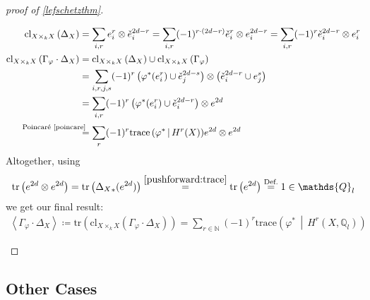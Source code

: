 \documentclass[english]{scrartcl}
\theoremstyle{definition}
\theoremstyle{remark}
\newcommand*{\N}{\mathds{N}}
\newcommand*{\Z}{\mathds{Z}}
\newcommand*{\Q}{\mathds{Q}}
\newcommand*{\Zl}{\Z_l} %
\newcommand*{\Ql}{\Q_l} %
\newcommand*{\tr}[1]{\text{tr}\left(#1\right)} %
\newcommand*{\intProd}[2]{{#1\cdot#2}} %
\newcommand*{\intNum}[1]{{\left\langle{#1}\right\rangle}} %
\newcommand*{\Graph}[1]{{\Gamma_{#1}}} %
\newcommand*{\Diag}[1]{{\Delta_{#1}}} %
\newcommand*{\trace}[2]{{\text{trace}\left(#1 \,\middle|\, #2 \right)}} %
\newcommand*{\cl}[2]{{\text{cl}_{#1}\left(#2\right)}} %
\renewcommand*{\phi}{\varphi}
\newcommand*{\Poincare}{{\text{Poincaré \ref{poincare}}}}
\begin{document}
\begin{proof}[proof of \autoref{lefschetzthm}]
\begin{enumerate}[label={Step \arabic*.}]
\begin{align*}
    \cl{X\times_k X}{\Diag{X}}
    &= \sum_{i,r} e_i^r\otimes \check e_i^{2d-r} =
      \sum_{i,r} (-1)^{r\cdot (2d-r)}\check e_i^r\otimes e_i^{2d-r} =
      \sum_{i,r} (-1)^{r}\check e_i^{2d-r}\otimes e_i^r\\
    \cl{X\times_k X}{\intProd{\Graph{\phi}}{\Diag{X}}}
    &= \cl{X\times_k X}{\Diag{X}} \cup \cl{X\times_k X}{\Graph{\phi}}\\
    &= \sum_{i,r,j,s} (-1)^{r}
      \left(\phi^*(e_i^r)\cup \check e_j^{2d-s}\right)
      \otimes \left(\check e_i^{2d-r}\cup e_j^s\right)\\
    &= \sum_{i,r} (-1)^{r}
      \left(\phi^*(e_i^r)\cup \check e_i^{2d-r}\right)
      \otimes e^{2d}\\
    &\overset{\mathllap{\Poincare}}=
      \sum_{r} (-1)^r \trace{\phi^*}{H^r(X)} e^{2d} \otimes e^{2d}
  \end{align*}
  Altogether, using
  \begin{align*}
    \tr{e^{2d} \otimes e^{2d}}
    = \tr{\Diag{X}_*(e^{2d})}
    \overset{\eqref{pushforward:trace}}= \tr{e^{2d}}
    \overset{\text{Def.}}= 1\in\Ql
  \end{align*}
  we get our final result:
  \begin{gather*}
    \intNum{\intProd{\Graph\phi}{\Diag X}} \coloneqq
    \tr{\cl{X\times_kX}{\intProd{\Graph\phi}{\Diag X}}}
    = \sum_{r\in\N} (-1)^r \trace{\phi^*}{H^r(X,\Ql)}
  \end{gather*}
\end{enumerate}
\end{proof}

\subsection{Other Cases}

\nocite{*}
\printbibliography
\end{document}

